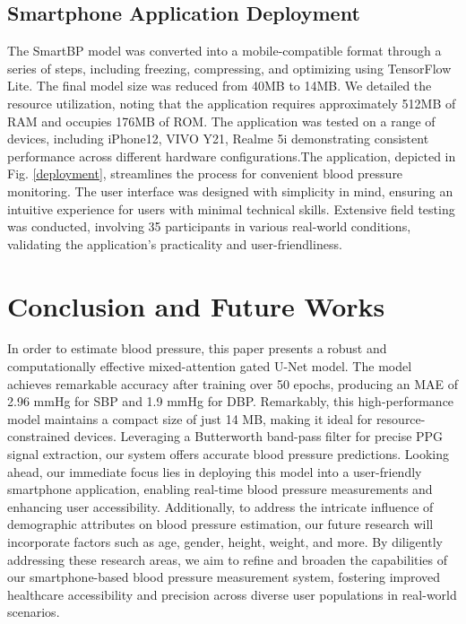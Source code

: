 \documentclass[journal,twoside,web]{ieeecolor}
\begin{document}
\subsection{Smartphone Application Deployment}
The SmartBP model was converted into a mobile-compatible format through a series of steps, including freezing, compressing, and optimizing using TensorFlow Lite. The final model size was reduced from 40MB to 14MB. We detailed the resource utilization, noting that the application requires approximately 512MB of RAM and occupies 176MB of ROM. The application was tested on a range of devices, including iPhone12, VIVO Y21, Realme 5i demonstrating consistent performance across different hardware configurations.The application, depicted in Fig. \ref{deployment}, streamlines the process for convenient blood pressure monitoring. The user interface was designed with simplicity in mind, ensuring an intuitive experience for users with minimal technical skills. Extensive field testing was conducted, involving 35 participants in various real-world conditions, validating the application's practicality and user-friendliness.
 
\section{Conclusion and Future Works}\label{conclusion}
In order to estimate blood pressure, this paper presents a robust and computationally effective mixed-attention gated U-Net model. The model achieves remarkable accuracy after training over 50 epochs, producing an MAE of 2.96 mmHg for SBP and 1.9 mmHg for DBP. Remarkably, this high-performance model maintains a compact size of just 14 MB, making it ideal for resource-constrained devices. Leveraging a Butterworth band-pass filter for precise PPG signal extraction, our system offers accurate blood pressure predictions. Looking ahead, our immediate focus lies in deploying this model into a user-friendly smartphone application, enabling real-time blood pressure measurements and enhancing user accessibility. Additionally, to address the intricate influence of demographic attributes on blood pressure estimation, our future research will incorporate factors such as age, gender, height, weight, and more. By diligently addressing these research areas, we aim to refine and broaden the capabilities of our smartphone-based blood pressure measurement system, fostering improved healthcare accessibility and precision across diverse user populations in real-world scenarios.





\end{document}
